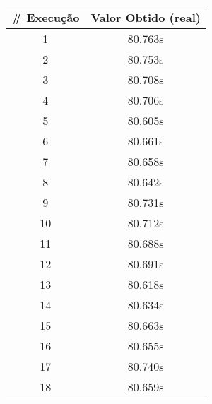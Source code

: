 \documentclass[11pt]{article}
\begin{document}
\begin{table}[!h]
\begin{center}
\begin{minipage}{0.48\textwidth}
\begin{tabular}{| c | c |}
				\textbf{\# Execução} &  \textbf{Valor Obtido (real)} \\ \hline
				1 & 80.763s \\ \hline
				2 & 80.753s \\ \hline
				3 & 80.708s \\ \hline
				4 & 80.706s \\ \hline
				5 & 80.605s \\ \hline
				6 & 80.661s \\ \hline
				7 & 80.658s \\ \hline
				8 & 80.642s \\ \hline
				9 & 80.731s \\ \hline
				10 & 80.712s \\ \hline
				11 & 80.688s \\ \hline
				12 & 80.691s \\ \hline
				13 & 80.618s \\ \hline
				14 & 80.634s \\ \hline
				15 & 80.663s \\ \hline
				16 & 80.655s \\ \hline
				17 & 80.740s \\ \hline
				18 & 80.659s \\ \hline
			\end{tabular}
		\end{minipage}
	\end{center}
\end{table}

\pagebreak
\end{document}
